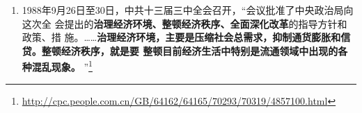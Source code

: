 \begin{enumerate}
\begin{quotation}
    新的经济运行机制，总体上来说应当是“\textbf{国家调节市场，市场引导企业}”的机制。
    国家运用经济手段、法律手段和必要的行政手段，调节市场供求关系，创造适宜的
    经济和社会环境，以此引导企业正确地进行经营决策。
  \end{quotation}

  据赵紫阳回忆，他作报告时，陈云中途退席。严立贤就此报告中的“\textbf{政府调控市场,市
    场引导企业}”写到
  \begin{quotation}
    在十二届三中全会，只是强调国家计划必须依据价值规律，而在这里，\textbf{国家计
      划必须通过市场来实现}，也即只能通过市场把企业引导到国家计划上来。这
    样，\textbf{指令性计划必然要退居次要位置}，整个经济体制因此向市场经济迈进了一
    大步。
    \footnote{\url{http://jds.cass.cn/ztyj/jjs/201605/t20160506_3324987.shtml}}
  \end{quotation}

  在马克思所作的科学共产主义重要纲领性文献《哥达纲领批判》中，将共产主义分为
  共产主义初级阶段（即社会主义）和共产主义高级阶段，初级阶段是向高级阶段的过
  渡期。“社会主义初级阶段”其实并不如报告中所说“已经进入社会主义社会”。它
  不是“共产主义初级阶段”——社会主义，而是相较社会主义阶段带有更多资产阶级
  法权的“前社会主义阶段”或“后资本主义阶段”。

  事实上，不管苏联或者中国如何左或如何宣称，都始终都未曾脱离国家资本主义为主
  体的范畴，列宁在战时共产主义失败后对此具有较为清醒认识。在社会主义国家阵营
  的实践中，马恩历史唯物主义中所说的\textbf{“物质生活条件、生产关系和交换关系的发展
  程度”确实是无法跨越的卡夫丁峡谷。}

  赵紫阳本次大会报告上提出\textbf{“一个中心”——以经济建设为中心，将坚持四项基本原
  则和坚持改革开放列为两个基本点。} 据赵紫阳《改革历程》记载，邓力群、胡乔木、
  王忍之等保守派在中共十三大之前对“一个中心，两个基本点”意见较大，他们认为
  应当坚持“四项基本原则为纲，改革开放为目”。此时自由派居保守派上风。


\item 1988年9月26日至30日，中共十三届三中全会召开，“会议批准了中央政治局向这次全
  会提出的\textbf{治理经济环境、整顿经济秩序、全面深化改革}的指导方针和政策、措
  施。……\textbf{治理经济环境，主要是压缩社会总需求，抑制通货膨胀和信贷。整顿经济秩序，就是要
  整顿目前经济生活中特别是流通领域中出现的各种混乱现象。}
  ”\footnote{\url{http://cpc.people.com.cn/GB/64162/64165/70293/70319/4857100.html}}


\end{enumerate}

